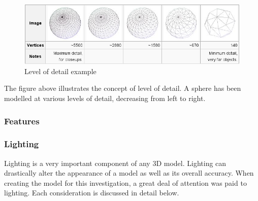 \documentclass[11pt,a4paper]{report}
\begin{document}
			\begin{figure}[H]
				\centering
				\includegraphics[width=1\textwidth]{level_of_detail_example}
				\caption{Level of detail example}
			\end{figure}
			
			
			The figure above illustrates the concept of level of detail. A sphere has been modelled at various levels of detail, decreasing from left to right.
			
			\subsubsection{Features}
				
			\subsubsection{Lighting}
				Lighting is a very important component of any 3D model. Lighting can drastically alter the appearance of a model as well as its overall accuracy. When creating the model for this investigation, a great deal of attention was paid to lighting. Each consideration is discussed in detail below.
				
\end{document}
